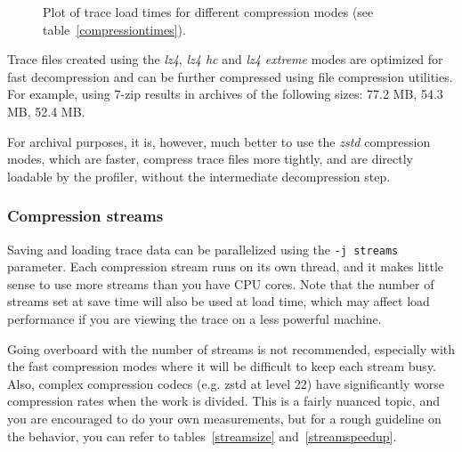 \documentclass[hidelinks,titlepage,a4paper,twoside]{article}
\begin{document}
\begin{figure}
\centering{}
\caption{Plot of trace load times for different compression modes (see table~\ref{compressiontimes}).}
\label{loadtime}
\end{figure}

Trace files created using the \emph{lz4}, \emph{lz4 hc} and \emph{lz4 extreme} modes are optimized for fast decompression and can be further compressed using file compression utilities. For example, using 7-zip results in archives of the following sizes: 77.2 MB, 54.3 MB, 52.4 MB.

For archival purposes, it is, however, much better to use the \emph{zstd} compression modes, which are faster, compress trace files more tightly, and are directly loadable by the profiler, without the intermediate decompression step.

\subsubsection{Compression streams}

Saving and loading trace data can be parallelized using the \texttt{-j streams} parameter. Each compression stream runs on its own thread, and it makes little sense to use more streams than you have CPU cores. Note that the number of streams set at save time will also be used at load time, which may affect load performance if you are viewing the trace on a less powerful machine.

Going overboard with the number of streams is not recommended, especially with the fast compression modes where it will be difficult to keep each stream busy. Also, complex compression codecs (e.g. zstd at level 22) have significantly worse compression rates when the work is divided. This is a fairly nuanced topic, and you are encouraged to do your own measurements, but for a rough guideline on the behavior, you can refer to tables~\ref{streamsize} and~\ref{streamspeedup}.
\end{document}
